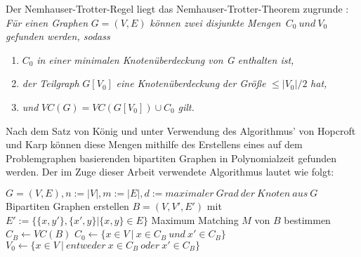 Der Nemhauser-Trotter-Regel liegt das Nemhauser-Trotter-Theorem zugrunde \cite{trott}:
\textit{Für einen Graphen} $G=(V,E)$ \textit{können zwei disjunkte Mengen}\ $C_{0}\ und\ V_{0}$ \textit{gefunden werden, sodass}
\begin{enumerate}
\item $C_{0}$ \textit{ in einer minimalen Knotenüberdeckung von G enthalten ist,}
\item \textit{der Teilgraph }$G[V_{0}]$ \textit{eine Knotenüberdeckung} \textit{der Größe} $\leq |V_{0}| / 2$ \textit{ hat,}
\item \textit{und} $VC(G) = VC(G[V_{0}])\cup C_{0}$ \textit{ gilt.}
\end{enumerate}
Nach dem Satz von König und unter Verwendung des Algorithmus' von Hopcroft und Karp \cite{paper:6} können diese Mengen mithilfe des Erstellens eines auf dem Problemgraphen basierenden bipartiten Graphen in Polynomialzeit gefunden werden. Der im Zuge dieser Arbeit verwendete Algorithmus \cite{fixed} lautet wie folgt:

\begin{algorithm}[caption={Nemhauser-Trotter-Regel.}, label={alg1}]
$G = (V, E), n:= |V|, m:=|E|, d:= maximaler\ Grad\ der\ Knoten\ aus\ G$
Bipartiten Graphen erstellen $B = (V, V', E')$ 
  mit $E':= \{\{x,y'\}, \{x', y\} | \{x,y\} \in E\}$ 
Maximum Matching $M$ von $B$ bestimmen 
$C_{B} \leftarrow VC(B)$ 
$C_{0} \leftarrow \{x \in V\ |\ x \in C_{B}\ und\ x' \in C_{B} \}$ 
$V_{0} \leftarrow \{x \in V\ |\ entweder\ x \in C_{B}\ oder\ x' \in C_{B} \}$ 
\end{algorithm}

